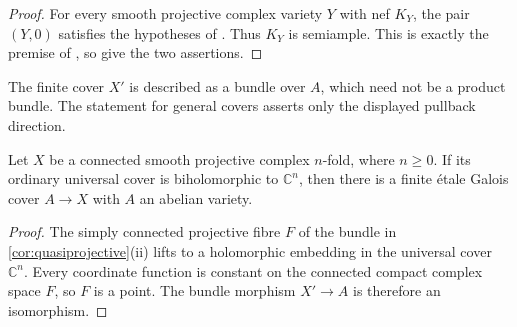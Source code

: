 \begin{proof}
For every smooth projective complex variety $Y$ with nef $K_Y$, the pair $(Y,0)$ satisfies the hypotheses of \cite[Theorem~1.1]{OpenAILogAbundance2026}. Thus $K_Y$ is semiample. This is exactly the premise of \cite[Conjecture~1.2]{ClaudonHoeringKollar2013}, so \cite[Theorem~1.1 and Corollary~1.5]{ClaudonHoeringKollar2013} give the two assertions.
\end{proof}

The finite cover $X'$ is described as a bundle over $A$, which need not be a product bundle. The statement for general covers asserts only the displayed pullback direction.

\begin{corollary}
\label{cor:affine-uniformization}
Let $X$ be a connected smooth projective complex $n$-fold, where $n\geq0$. If its ordinary universal cover is biholomorphic to $\mathbb{C}^n$, then there is a finite \'etale Galois cover $A\to X$ with $A$ an abelian variety.
\end{corollary}

\begin{proof}
The simply connected projective fibre $F$ of the bundle in \cref{cor:quasiprojective}\textup{(ii)} lifts to a holomorphic embedding in the universal cover $\mathbb{C}^n$. Every coordinate function is constant on the connected compact complex space $F$, so $F$ is a point. The bundle morphism $X'\to A$ is therefore an isomorphism.
\end{proof}
